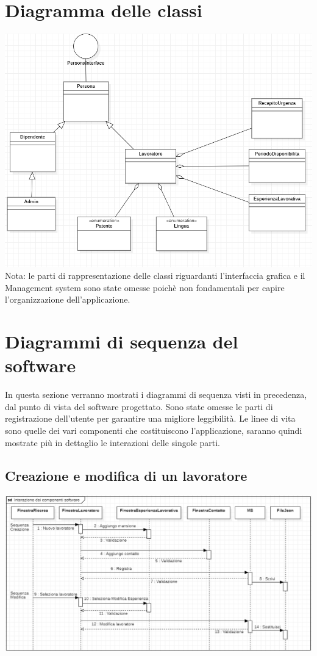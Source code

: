 \documentclass[ 4paper,11pt,openany]{book}
\begin{document}
\section{Diagramma delle classi}
\includegraphics[width=185mm]{classi.png}
Nota: le parti di rappresentazione delle classi riguardanti l'interfaccia grafica e il Management system sono state omesse poichè non fondamentali per capire l'organizzazione dell'applicazione.
\section{Diagrammi di sequenza del software}
In questa sezione verranno mostrati i diagrammi di sequenza visti in precedenza, dal punto di vista del software progettato. Sono state omesse le parti di registrazione dell'utente per garantire una migliore leggibilità. Le linee di vita sono quelle dei vari componenti che costituiscono l'applicazione, saranno quindi mostrate più in dettaglio le interazioni delle singole parti.
\subsection{Creazione e modifica di un lavoratore}
\includegraphics[width=180mm]{softwareseq.png}
\end{document}
